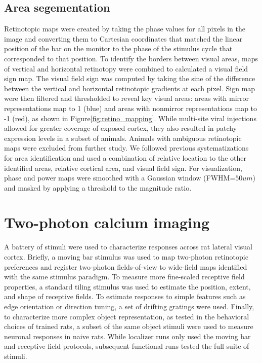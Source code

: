 \subsection{Area segementation}
Retinotopic maps were created by taking the phase values for all pixels in the image and converting them to Cartesian coordinates that matched the linear position of the bar on the monitor to the phase of the stimulus cycle that corresponded to that position. To identify the borders between visual areas, maps of vertical and horizontal retinotopy were combined to calculated a visual field sign map\cite{Juavinett2017, Zhuang2017}. The visual field sign was computed by taking the sine of the difference between the vertical and horizontal retinotopic gradients at each pixel. Sign map were then filtered and thresholded to reveal key visual areas:  areas with mirror representations map to 1 (blue) and areas with nonmirror representations map to -1 (red), as shown in Figure\ref{fig:retino_mapping}. 
While multi-site viral injections allowed for greater coverage of exposed cortex, they also resulted in patchy expression levels in a subset of animals. Animals with ambiguous retinotopic maps were excluded from further study. We followed previous systematizations for area identification\cite{Juavinett2017} and used a combination of relative location to the other identified areas, relative cortical area, and visual field sign. For visualization, phase and power maps were smoothed with a Gaussian window (FWHM=$50um$) and masked by applying a threshold to the magnitude ratio.  

\section{Two-photon calcium imaging}
A battery of stimuli were used to characterize responses across rat lateral visual cortex. Briefly, a moving bar stimulus was used to map two-photon retinotopic preferences and register two-photon fields-of-view to wide-field maps identified with the same stimulus paradigm. To measure more fine-scaled receptive field properties, a standard tiling stimulus was used to estimate the position, extent, and shape of receptive fields. To estimate responses to simple features such as edge orientation or direction tuning, a set of drifting gratings were used. Finally, to characterize more complex object representation, as tested in the behavioral choices of trained rats, a subset of the same object stimuli were used to measure neuronal responses in naive rats. While localizer runs only used the moving bar and receptive field protocols, subsequent functional runs tested the full suite of stimuli.  

